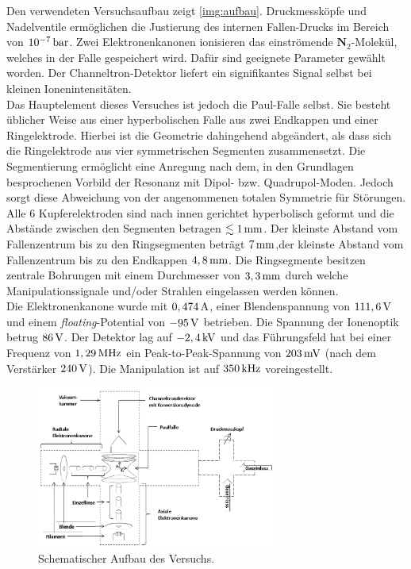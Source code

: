 \documentclass[numbers=noenddot,a4paper,notitlepage,twoside,BCOR15mm]{scrartcl}
\newcommand{\tenpo}[1]{ 10^{#1}}
\newcommand{\tilt}[1]{\textit{#1}}
\newcommand{\fett}[1]{\textbf{#1}}
\begin{document}
		Den verwendeten Versuchsaufbau zeigt \autoref{img:aufbau}. Druckmessköpfe und Nadelventile ermöglichen die Justierung des internen Fallen-Drucks im Bereich von $\unit[\tenpo{-7}]{bar}$. Zwei Elektronenkanonen ionisieren das einströmende $\fett{N}_2$-Molekül, welches in der Falle gespeichert wird. Dafür sind geeignete Parameter gewählt worden. Der Channeltron-Detektor liefert ein signifikantes Signal selbst bei kleinen Ionenintensitäten.\\
		Das Hauptelement dieses Versuches ist jedoch die Paul-Falle selbst. Sie besteht üblicher Weise aus einer hyperbolischen Falle aus zwei Endkappen und einer Ringelektrode. Hierbei ist die Geometrie dahingehend abgeändert, als dass sich die Ringelektrode aus vier symmetrischen Segmenten zusammensetzt. Die Segmentierung ermöglicht eine Anregung nach dem, in den Grundlagen besprochenen Vorbild der Resonanz mit Dipol- bzw. Quadrupol-Moden. Jedoch sorgt diese Abweichung von der angenommenen totalen Symmetrie für Störungen.\\
		Alle 6 Kupferelektroden sind nach innen gerichtet hyperbolisch geformt und die Abstände zwischen den Segmenten betragen $\lesssim\unit[1]{mm}$. Der kleinste Abstand vom Fallenzentrum bis zu den Ringsegmenten beträgt $\unit[7]{mm}$,der kleinste Abstand vom Fallenzentrum bis zu den Endkappen $\unit[4,8]{mm}$. Die Ringsegmente besitzen zentrale Bohrungen mit einem Durchmesser von $\unit[3,3]{mm}$ durch welche Manipulationssignale und/oder Strahlen eingelassen werden können.\\
		Die Elektronenkanone wurde mit $\unit[0,474]{A}$, einer Blendenspannung von $\unit[111,6]{V}$ und einem \tilt{floating}-Potential von $\unit[-95]{V}$ betrieben. Die Spannung der Ionenoptik betrug $\unit[86]{V}$. Der Detektor lag auf $\unit[-2,4]{kV}$ und das Führungsfeld hat bei einer Frequenz von $\unit[1,29]{MHz}$ ein Peak-to-Peak-Spannung von $\unit[203]{mV}$ (nach dem Verstärker $\unit[240]{V}$). Die Manipulation ist auf $\unit[350]{kHz}$ voreingestellt.

			\begin{figure}
				\centering
				\includegraphics[width=0.7\textwidth]{aufbau.png}
				\caption{Schematischer Aufbau des Versuchs. \cite{EMAUGreifswaldPaul}}\label{img:aufbau}
			\end{figure}
\end{document}
